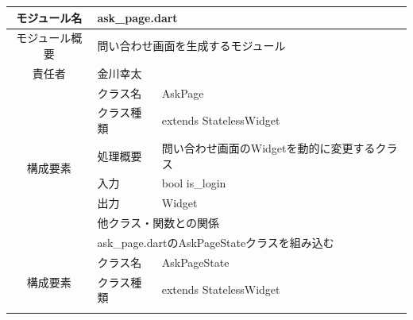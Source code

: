 \begin{table}[H]
  \centering
  \begin{tabular}{|c|l|l|} \hline
    モジュール名                & \multicolumn{2}{l|}{ask\_page.dart}                                                                                   \\ \hline
    モジュール概要               & \multicolumn{2}{p{12cm}|}{問い合わせ画面を生成するモジュール}                                                                          \\ \hline
    責任者                   & \multicolumn{2}{l|}{金川幸太}                                                                                             \\ \hline
    \multirow{7}{*}{構成要素} & クラス名                                                           & AskPage                                              \\ \cline{2-3}
                          & クラス種類                                                          & extends StatelessWidget                              \\ \cline{2-3}
                          & 処理概要                                                           & \multicolumn{1}{p{12cm}|}{問い合わせ画面のWidgetを動的に変更するクラス} \\ \cline{2-3}
                          & 入力                                                             & bool is\_login                                       \\ \cline{2-3}
                          & 出力                                                             & Widget                                               \\ \cline{2-3}
                          & \multicolumn{2}{l|}{他クラス・関数との関係}                                                                                      \\ \cline{2-3}
                          & \multicolumn{2}{p{14cm}|}{ask\_page.dartのAskPageStateクラスを組み込む}                                                        \\ \hline
    \multirow{7}{*}{構成要素} & クラス名                                                           & AskPageState                                         \\ \cline{2-3}
                          & クラス種類                                                          & extends StatelessWidget                              \\ \cline{2-3}

\end{tabular}
\end{table}
